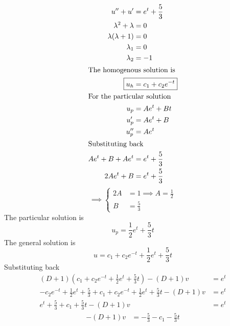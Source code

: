 \documentclass{zc-ust-hw}
\begin{document}
\begin{enumerate}
\begin{sol}
        \begin{align}
          u'' + u' &= e^{t} + \frac{5}{3} \\
          \lambda^2 + \lambda &= 0 \\
          \lambda(\lambda+1) &= 0 \\
          \lambda_{1} &= 0 \\
          \lambda_{2} &= -1 \\
          \intertext{The homogenous solution is}
          \Aboxed{u_{h} &= c_{1}+c_{2}e^{-t}} \\
          \intertext{For the particular solution}
          u_{p} &= Ae^{t} + Bt \\
          u_{p}' &= Ae^{t} + B \\
          u_{p}'' &= Ae^{t} \\
          \intertext{Substituting back}
          Ae^{t} + B + Ae^{t} &= e^{t} + \frac{5}{3} \\
          2Ae^{t} + B &= e^{t} + \frac{5}{3}
        \end{align}
        \begin{equation}
          \implies\begin{cases}
            2A &= 1 \implies A =\frac{1}{2} \\
            B &= \frac{5}{3}
          \end{cases}
        \end{equation}
        The particular solution is
        \begin{equation}
          \boxed{u_{p} = \frac{1}{2}e^{t} + \frac{5}{3}t}
        \end{equation}
        The general solution is
        \begin{equation}
          \boxed{u = c_{1}+c_{2}e^{-t} + \frac{1}{2}e^{t} + \frac{5}{3}t}
        \end{equation}
        Substituting back
        \begin{align}
          (D+1)\left( c_{1}+c_{2}e^{-t} + \frac{1}{2}e^{t} + \frac{5}{3}t \right) -(D+1)v&=e^{t} \\
           -c_{2}e^{-t} + \frac{1}{2}e^{t} + \frac{5}{3} +  c_{1}+c_{2}e^{-t} + \frac{1}{2}e^{t} + \frac{5}{3}t - (D+1)v&=e^{t} \\
           e^{t} + \frac{5}{3} +  c_{1} + \frac{5}{3}t - (D+1)v&=e^{t}
        \end{align}
        \begin{align}
          -(D+1)v &= -\frac{5}{3} - c_{1} - \frac{5}{3}t \\

\end{align}
\end{sol}
\end{enumerate}
\end{document}

